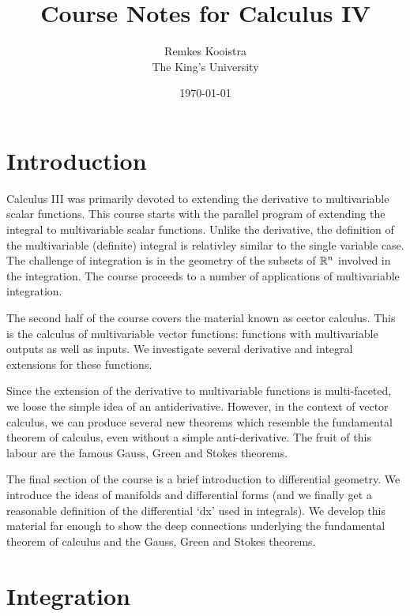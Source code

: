 \documentclass[fleqn,letterpaper]{report}
\begin{document}
\title{Course Notes for Calculus IV}
\author{Remkes Kooistra\\
	The King's University}
\date{\today}
\maketitle

\setcounter{tocdepth}{1}
\tableofcontents

\chapter{Introduction}
\label{introduction}

Calculus III was primarily devoted to extending the derivative
to multivariable scalar functions. This course starts with the
parallel program of extending the integral to multivariable
scalar functions. Unlike the derivative, the definition of the
multivariable (definite) integral is relativley similar to the
single variable case. The challenge of integration is in the
geometry of the subsets of $\mathbb{R}^n$ involved in the
integration. The course proceeds to a number of applications
of multivariable integration.

The second half of the course covers the material known as
cector calculus. This is the calculus of multivariable vector
functions: functions with multivariable outputs as well as
inputs. We investigate several derivative and integral
extensions for these functions.

Since the extension of the derivative to multivariable 
functions is multi-faceted, we loose the simple idea of an
antiderivative. However, in the context of vector calculus, we
can produce several new theorems which resemble the
fundamental theorem of calculus, even without a simple
anti-derivative. The fruit of this labour are the famous
Gauss, Green and Stokes theorems.

The final section of the course is a brief introduction to
differential geometry. We introduce the ideas of manifolds and
differential forms (and we finally get a reasonable definition
of the differential `dx' used in integrals). We develop
this material far enough to show the deep connections
underlying the fundamental theorem of calculus and the Gauss,
Green and Stokes theorems.

\chapter{Integration}
\label{integration}
\end{document}
